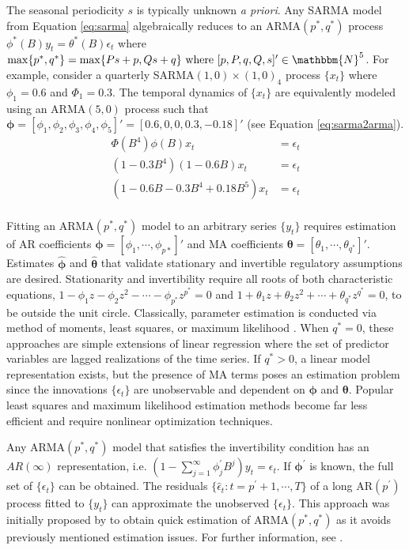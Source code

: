 The seasonal periodicity $s$ is typically unknown \textit{a priori}. Any SARMA model from Equation \ref{eq:sarma} algebraically reduces to an ARMA$(p^*,q^*)$ process $\phi^*(B)y_t=\theta^*(B)\epsilon_t$ where $\max\{p^*,q^*\}=\max\{Ps+p,Qs+q\} \textrm{ where } [p,P,q,Q,s]'\in\mathbbm{N}^5$. For example, consider a quarterly SARMA$(1,0)\times(1,0)_{4}$ process $\{x_t\}$ where $\phi_1=0.6$ and $\Phi_1=0.3$. The temporal dynamics of $\{x_t\}$ are equivalently modeled using an ARMA$(5,0)$ process such that $\bm{\phi}=[\phi_1,\phi_2,\phi_3,\phi_4,\phi_5]'=[0.6,0,0,0.3,-0.18]'$ (see Equation \ref{eq:sarma2arma}).
\begin{equation}
\label{eq:sarma2arma}
\begin{split}
\Phi(B^4)\phi(B)x_t&=\epsilon_t\\
(1-0.3B^4)(1-0.6B)x_t&=\epsilon_t\\
(1-0.6B-0.3B^4+0.18B^5)x_t&=\epsilon_t\\
\end{split}
\end{equation}

Fitting an ARMA$(p^*,q^*)$ model to an arbitrary series $\{y_t\}$ requires estimation of AR coefficients $\bm{\phi}=[\phi_1,\cdots,\phi_{p*}]'$ and MA coefficients $\bm{\theta}=[\theta_1,\cdots,\theta_{q^*}]'$. Estimates $\hat{\bm{\phi} }$ and $\hat{\bm{\theta} }$ that validate stationary and invertible regulatory assumptions are desired. Stationarity and invertibility require all roots of both characteristic equations, $1-\phi_1z-\phi_2z^2-\cdots -\phi_{p^*}z^{p^*}=0$ and $1+\theta_1z+\theta_2z^2+\cdots +\theta_{q^*}z^{q^*}=0$, to be outside the unit circle. Classically, parameter estimation is conducted via method of moments, least squares, or maximum likelihood \citep{Hamilton1994, Cryer2008}. When $q^*=0$, these approaches are simple extensions of linear regression where the set of predictor variables are lagged realizations of the time series. If $q^*>0$, a linear model representation exists, but the presence of MA terms poses an estimation problem since the innovations $\{\epsilon_t\}$ are unobservable and dependent on $\bm{\phi}$ and $\bm{\theta}$. Popular least squares and maximum likelihood estimation methods become far less efficient and require nonlinear optimization techniques.

Any ARMA$(p^*,q^*)$ model that satisfies the invertibility condition has an $AR(\infty)$ representation, i.e. $(1-\sum\limits_{j=1}^\infty \phi^\prime_jB^j)y_t=\epsilon_t$. If $\bm{\phi}^\prime$ is known, the full set of $\{\epsilon_t\}$ can be obtained. The residuals $\{\hat{\epsilon}_t: t=p^\prime+1,\cdots,T\}$ of a long AR$(p^\prime)$ process fitted to  $\{y_t\}$ can approximate the unobserved $\{\epsilon_t\}$.  This approach was initially proposed by \cite{Hannan1982} to obtain quick estimation of ARMA$(p^*,q^*)$ as it avoids previously mentioned estimation issues. For further information, see \citet[pp. 156-158]{Brockwell2016}.

